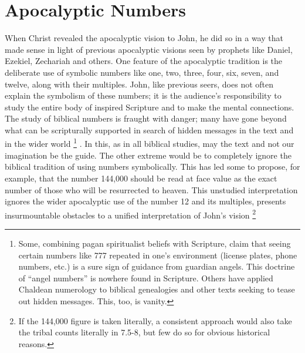 \backmatter
\appendix
\appendixpage
\onecolumn
\setcounter{footnote}{0}
\chapter*{Apocalyptic Numbers}
\fancyhead{} %

When Christ revealed the apocalyptic vision to John, he did so in a way that made sense in light of previous 
apocalyptic visions seen by prophets like Daniel, Ezekiel, Zechariah and others. One feature of the apocalyptic 
tradition is the deliberate use of symbolic numbers like one, two, three, four, six, seven, and twelve, along with their multiples. 
John, like previous seers, does not often explain the symbolism of these numbers; it is the audience's 
responsibility to study the entire body of inspired Scripture and to make the mental connections. 
\newline\newline
The study of biblical numbers is fraught with danger; many have gone beyond what can be scripturally supported in search of hidden messages in the text and in the wider world%
\footnote{Some, combining pagan spiritualist beliefs with Scripture, claim that seeing certain numbers like 777 repeated in one's environment (license plates, phone numbers, etc.) is a sure sign of guidance from guardian angels. This doctrine of ``angel numbers'' is nowhere found in Scripture. Others have applied Chaldean numerology to biblical genealogies and other texts seeking to tease out hidden messages. This, too, is vanity.}%
. In this, as in all biblical studies, may the text and not our imagination be the guide. The other extreme would be to completely ignore the biblical tradition of using numbers symbolically. This has led some to propose, for example, that the number 144,000 should be read at face value as the exact number of those who will be resurrected to heaven. This unstudied interpretation ignores the wider apocalyptic use of the number 12 and its multiples, presents insurmountable obstacles to a unified interpretation of John's vision%
\footnote{If the 144,000 figure is taken literally, a consistent approach would also take the tribal counts literally in 7.5-8, but few do so for obvious historical reasons.} %
